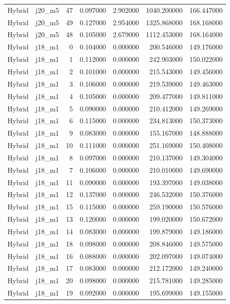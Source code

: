 \begin{tabular}{llrrrrr}
Hybrid & j20_m5 & 47 & 0.097000 & 2.902000 & 1040.200000 & 166.447000 \\
Hybrid & j20_m5 & 49 & 0.127000 & 2.954000 & 1325.868000 & 168.168000 \\
Hybrid & j20_m5 & 48 & 0.105000 & 2.679000 & 1112.453000 & 168.164000 \\
Hybrid & j18_m1 & 0 & 0.104000 & 0.000000 & 200.546000 & 149.176000 \\
Hybrid & j18_m1 & 1 & 0.112000 & 0.000000 & 242.903000 & 150.022000 \\
Hybrid & j18_m1 & 2 & 0.101000 & 0.000000 & 215.543000 & 149.456000 \\
Hybrid & j18_m1 & 3 & 0.106000 & 0.000000 & 219.539000 & 149.463000 \\
Hybrid & j18_m1 & 4 & 0.105000 & 0.000000 & 209.477000 & 149.811000 \\
Hybrid & j18_m1 & 5 & 0.090000 & 0.000000 & 210.412000 & 149.269000 \\
Hybrid & j18_m1 & 6 & 0.115000 & 0.000000 & 234.813000 & 150.373000 \\
Hybrid & j18_m1 & 9 & 0.083000 & 0.000000 & 155.167000 & 148.888000 \\
Hybrid & j18_m1 & 10 & 0.111000 & 0.000000 & 251.169000 & 150.408000 \\
Hybrid & j18_m1 & 8 & 0.097000 & 0.000000 & 210.137000 & 149.304000 \\
Hybrid & j18_m1 & 7 & 0.106000 & 0.000000 & 210.010000 & 149.690000 \\
Hybrid & j18_m1 & 11 & 0.090000 & 0.000000 & 193.397000 & 149.038000 \\
Hybrid & j18_m1 & 12 & 0.137000 & 0.000000 & 246.532000 & 150.376000 \\
Hybrid & j18_m1 & 15 & 0.115000 & 0.000000 & 259.190000 & 150.576000 \\
Hybrid & j18_m1 & 13 & 0.120000 & 0.000000 & 199.020000 & 150.672000 \\
Hybrid & j18_m1 & 14 & 0.083000 & 0.000000 & 199.879000 & 149.186000 \\
Hybrid & j18_m1 & 18 & 0.098000 & 0.000000 & 208.846000 & 149.575000 \\
Hybrid & j18_m1 & 16 & 0.088000 & 0.000000 & 202.097000 & 149.074000 \\
Hybrid & j18_m1 & 17 & 0.083000 & 0.000000 & 212.172000 & 149.240000 \\
Hybrid & j18_m1 & 20 & 0.098000 & 0.000000 & 215.781000 & 149.285000 \\
Hybrid & j18_m1 & 19 & 0.092000 & 0.000000 & 195.699000 & 149.155000 \\

\end{tabular}
